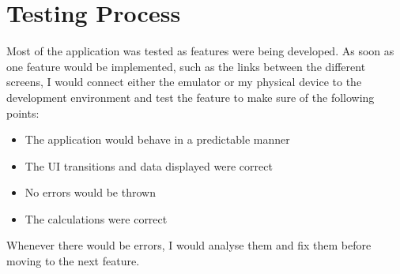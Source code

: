 \chapter{Testing Process}
Most of the application was tested as features were being developed. As soon as one feature would be implemented, such as the links between the different screens, I would connect either the emulator or my physical device to the development environment and test the feature to make sure of the following points:

\begin{itemize}
  \item The application would behave in a predictable manner
  \item The UI transitions and data displayed were correct
  \item No errors would be thrown
  \item The calculations were correct
\end{itemize}

Whenever there would be errors, I would analyse them and fix them before moving to the next feature.
